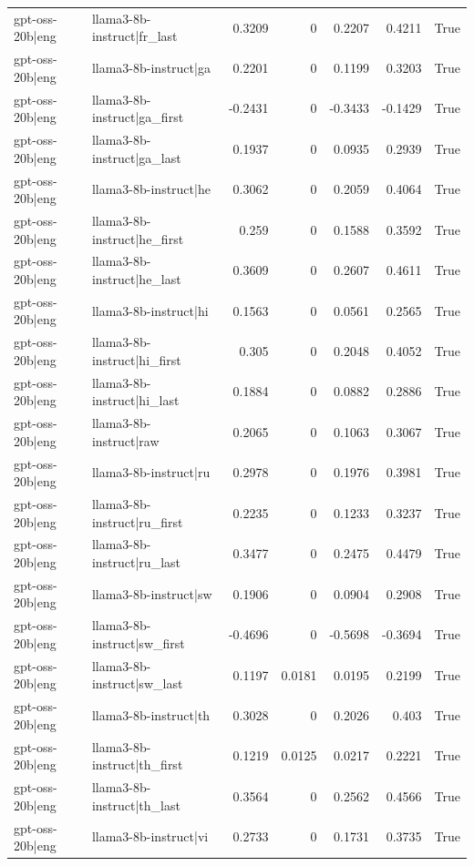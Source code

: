 \begin{table}
\begin{tabular}{l l r r r r l}
gpt-oss-20b|eng & llama3-8b-instruct|fr_last & 0.3209 & 0 & 0.2207 & 0.4211 & True \\
gpt-oss-20b|eng & llama3-8b-instruct|ga & 0.2201 & 0 & 0.1199 & 0.3203 & True \\
gpt-oss-20b|eng & llama3-8b-instruct|ga_first & -0.2431 & 0 & -0.3433 & -0.1429 & True \\
gpt-oss-20b|eng & llama3-8b-instruct|ga_last & 0.1937 & 0 & 0.0935 & 0.2939 & True \\
gpt-oss-20b|eng & llama3-8b-instruct|he & 0.3062 & 0 & 0.2059 & 0.4064 & True \\
gpt-oss-20b|eng & llama3-8b-instruct|he_first & 0.259 & 0 & 0.1588 & 0.3592 & True \\
gpt-oss-20b|eng & llama3-8b-instruct|he_last & 0.3609 & 0 & 0.2607 & 0.4611 & True \\
gpt-oss-20b|eng & llama3-8b-instruct|hi & 0.1563 & 0 & 0.0561 & 0.2565 & True \\
gpt-oss-20b|eng & llama3-8b-instruct|hi_first & 0.305 & 0 & 0.2048 & 0.4052 & True \\
gpt-oss-20b|eng & llama3-8b-instruct|hi_last & 0.1884 & 0 & 0.0882 & 0.2886 & True \\
gpt-oss-20b|eng & llama3-8b-instruct|raw & 0.2065 & 0 & 0.1063 & 0.3067 & True \\
gpt-oss-20b|eng & llama3-8b-instruct|ru & 0.2978 & 0 & 0.1976 & 0.3981 & True \\
gpt-oss-20b|eng & llama3-8b-instruct|ru_first & 0.2235 & 0 & 0.1233 & 0.3237 & True \\
gpt-oss-20b|eng & llama3-8b-instruct|ru_last & 0.3477 & 0 & 0.2475 & 0.4479 & True \\
gpt-oss-20b|eng & llama3-8b-instruct|sw & 0.1906 & 0 & 0.0904 & 0.2908 & True \\
gpt-oss-20b|eng & llama3-8b-instruct|sw_first & -0.4696 & 0 & -0.5698 & -0.3694 & True \\
gpt-oss-20b|eng & llama3-8b-instruct|sw_last & 0.1197 & 0.0181 & 0.0195 & 0.2199 & True \\
gpt-oss-20b|eng & llama3-8b-instruct|th & 0.3028 & 0 & 0.2026 & 0.403 & True \\
gpt-oss-20b|eng & llama3-8b-instruct|th_first & 0.1219 & 0.0125 & 0.0217 & 0.2221 & True \\
gpt-oss-20b|eng & llama3-8b-instruct|th_last & 0.3564 & 0 & 0.2562 & 0.4566 & True \\
gpt-oss-20b|eng & llama3-8b-instruct|vi & 0.2733 & 0 & 0.1731 & 0.3735 & True \\

\end{tabular}
\end{table}
